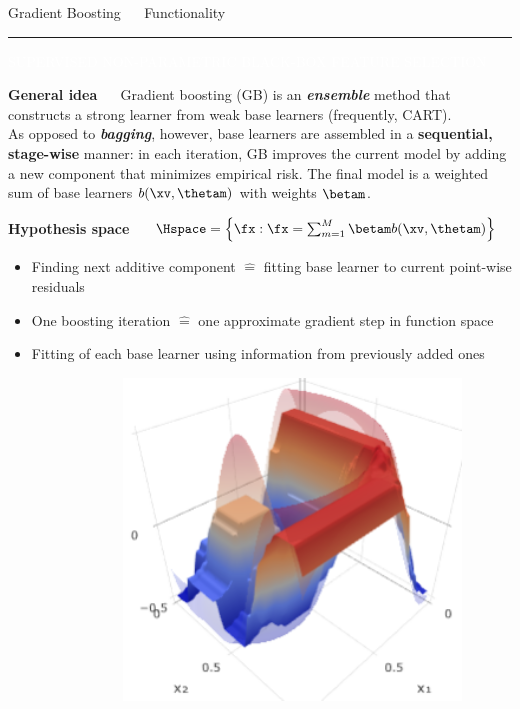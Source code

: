 \documentclass[11pt,compress,t,notes=noshow, xcolor=table]{beamer}
\begin{document}
\LARGE
\begin{frame}{\textcolor{gray!80}{Gradient Boosting} ~~ Functionality}
\normalsize
\vspace{-0.5cm}
\noindent \textcolor{gray!80}{\rule{\textwidth}{1pt}}

\vspace{0.3cm}

\footnotesize

\colorbox{gray!80}{\textcolor{white}{SUPERVISED}} 
\colorbox{gray!80}{\textcolor{white}{NON-PARAMETRIC}} 
\colorbox{gray!80}{\textcolor{white}{BLACK-BOX}}
\colorbox{gray!80}{\textcolor{white}{FEATURE SELECTION}}

\medskip

\textbf{\textcolor{gray!80}{General idea}} ~~ Gradient boosting (GB) is an
\textit{\textbf{ensemble}} method that constructs a strong learner from weak 
base learners (frequently, CART). \\
As opposed to \textit{\textbf{bagging}}, however, base learners are assembled
in a \textbf{sequential, stage-wise} manner: in each iteration, GB improves the 
current model by adding a new component that minimizes empirical risk. The final 
model is a weighted sum of base learners $b(\xv, \thetam)$ with weights 
$\betam$.

\medskip

\textbf{\textcolor{gray!80}{Hypothesis space}} ~~
$\Hspace = \left\{ \fx: \fx = \sum_{m = 1}^M \betam b(\xv, \thetam) \right\}$

\medskip

\begin{minipage}{0.6\textwidth}
  \begin{itemize}
    \item Finding next additive component $\widehat{=}$ fitting base learner
    to current point-wise residuals  
    \item One boosting iteration $\widehat{=}$ one approximate gradient step in 
    function space
    \item Fitting of each base learner using information from previously
    added ones
  \end{itemize}
\end{minipage}%
\begin{minipage}{0.4\textwidth}
  \includegraphics[width=0.9\textwidth]{figure/gb_3d.PNG}
\end{minipage}

\end{frame}
\end{document}
